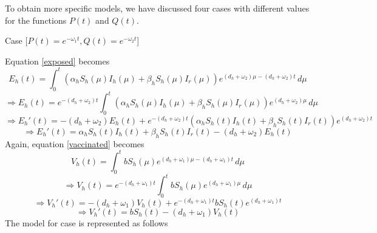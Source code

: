 To obtain more specific models, we have discussed four cases with different values for the functions $P(t)$ and $Q(t)$.

Case  [$P(t)=e^{-\omega_{1} t}, Q(t)=e^{-\omega_{2} t}$]

Equation \ref{exposed} becomes
\[E_{h}(t) = \int_{0}^{t} (\alpha_{h}S_{h}(\mu)I_{h}(\mu) + \beta_{h}S_{h}(\mu)I_{r}(\mu)) e^{(d_{h}+\omega_{2})\mu-(d_{h}+\omega_{2})t} \,d\mu\]
\[\Rightarrow E_{h}(t) = e^{-(d_{h}+\omega_{2})t}\int_{0}^{t} (\alpha_{h}S_{h}(\mu)I_{h}(\mu) + \beta_{h}S_{h}(\mu)I_{r}(\mu)) e^{(d_{h}+\omega_{2})\mu} \,d\mu\]
\[\Rightarrow E_{h}'(t) = -(d_{h}+\omega_{2})E_{h}(t) + e^{-(d_{h}+\omega_{2})t}(\alpha_{h}S_{h}(t)I_{h}(t) + \beta_{h}S_{h}(t)I_{r}(t)) e^{(d_{h}+\omega_{2})t}\]
\[\Rightarrow E_{h}'(t) = \alpha_{h}S_{h}(t)I_{h}(t) + \beta_{h}S_{h}(t)I_{r}(t)-(d_{h}+\omega_{2})E_{h}(t)\]
Again, equation \ref{vaccinated} becomes
\[V_{h}(t) = \int_{0}^{t} bS_{h}(\mu)e^{(d_{h}+\omega_{1})\mu-(d_{h}+\omega_{1})t} \,d\mu\]
\[\Rightarrow V_{h}(t) = e^{-(d_{h}+\omega_{1})t}\int_{0}^{t} bS_{h}(\mu) e^{(d_{h}+\omega_{1})\mu} \,d\mu\]
\[\Rightarrow V_{h}'(t) = -(d_{h}+\omega_{1})V_{h}(t) + e^{-(d_{h}+\omega_{1})t}bS_{h}(t) e^{(d_{h}+\omega_{1})t}\]
\[\Rightarrow V_{h}'(t) = bS_{h}(t)-(d_{h}+\omega_{1})V_{h}(t)\]
The model for case  is represented as follows
